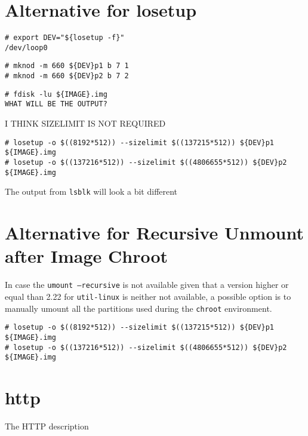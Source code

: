 \section{Alternative for losetup}
\label{sec:alternative_losetup}

\begin{lstlisting}[]
# export DEV="${losetup -f}"
/dev/loop0
\end{lstlisting}
\FloatBarrier
\vspace{-5mm}

\begin{lstlisting}[]
# mknod -m 660 ${DEV}p1 b 7 1
# mknod -m 660 ${DEV}p2 b 7 2
\end{lstlisting}
\FloatBarrier
\vspace{-5mm}

\begin{lstlisting}[]
# fdisk -lu ${IMAGE}.img
WHAT WILL BE THE OUTPUT?
\end{lstlisting}
\FloatBarrier
\vspace{-5mm}

I THINK SIZELIMIT IS NOT REQUIRED
\begin{lstlisting}[]
# losetup -o $((8192*512)) --sizelimit $((137215*512)) ${DEV}p1 ${IMAGE}.img
# losetup -o $((137216*512)) --sizelimit $((4806655*512)) ${DEV}p2 ${IMAGE}.img
\end{lstlisting}
\FloatBarrier
\vspace{-5mm}

The output from \texttt{lsblk} will look a bit different

\section{Alternative for Recursive Unmount after Image Chroot}
\label{sec:umount}

In case the \texttt{umount --recursive} is not available given that a version
higher or equal than 2.22 for \texttt{util-linux} is neither not available,
a possible option is to manually umount all the partitions used during the
\texttt{chroot} environment.

\begin{lstlisting}[]
# losetup -o $((8192*512)) --sizelimit $((137215*512)) ${DEV}p1 ${IMAGE}.img
# losetup -o $((137216*512)) --sizelimit $((4806655*512)) ${DEV}p2 ${IMAGE}.img
\end{lstlisting}
\FloatBarrier
\vspace{-5mm}

\section{http}
\label{sec:http}

The HTTP description

